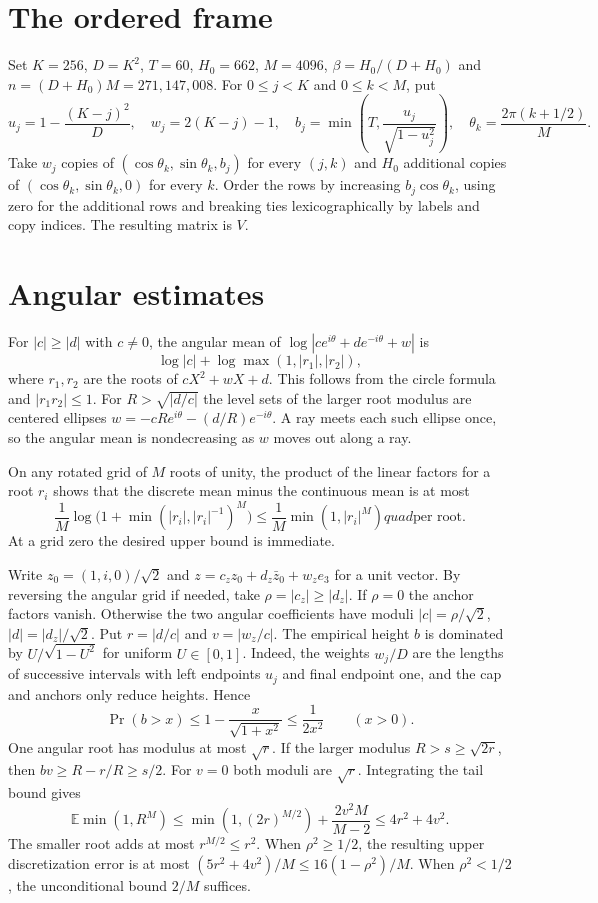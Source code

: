\documentclass[11pt]{article}
\begin{document}
\section{The ordered frame}

Set $K=256$, $D=K^2$, $T=60$, $H_0=662$, $M=4096$, $\beta=H_0/(D+H_0)$ and $n=(D+H_0)M=271{,}147{,}008$. For $0\le j<K$ and $0\le k<M$, put
\[
 u_j=1-\frac{(K-j)^2}{D},\quad
 w_j=2(K-j)-1,\quad b_j=\min\left(T,\frac{u_j}{\sqrt{1-u_j^2}}\right),\quad
 \theta_k=\frac{2\pi(k+1/2)}{M}.
\]
Take $w_j$ copies of $(\cos\theta_k,\sin\theta_k,b_j)$ for every $(j,k)$ and $H_0$ additional copies of $(\cos\theta_k,\sin\theta_k,0)$ for every $k$. Order the rows by increasing $b_j\cos\theta_k$, using zero for the additional rows and breaking ties lexicographically by labels and copy indices. The resulting matrix is $V$.

\section{Angular estimates}

For $|c|\ge |d|$ with $c\ne0$, the angular mean of
$\log|c e^{i\theta}+d e^{-i\theta}+w|$ is
\[
 \log|c|+\log\max(1,|r_1|,|r_2|),
\]
where $r_1,r_2$ are the roots of $cX^2+wX+d$. This follows from the circle formula and $|r_1r_2|\le1$. For $R>\sqrt{|d/c|}$ the level sets of the larger root modulus are centered ellipses $w=-cRe^{i\theta}-(d/R)e^{-i\theta}$. A ray meets each such ellipse once, so the angular mean is nondecreasing as $w$ moves out along a ray.

On any rotated grid of $M$ roots of unity, the product of the linear factors for a root $r_i$ shows that the discrete mean minus the continuous mean is at most
\[
 \frac1M\log\bigl(1+\min(|r_i|,|r_i|^{-1})^M\bigr)\le\frac1M\min(1,|r_i|^M)
quad\text{per root}.
\]
At a grid zero the desired upper bound is immediate.

Write $z_0=(1,i,0)/\sqrt2$ and $z=c_z z_0+d_z\bar z_0+w_z e_3$ for a unit vector. By reversing the angular grid if needed, take $\rho=|c_z|\ge|d_z|$. If $\rho=0$ the anchor factors vanish. Otherwise the two angular coefficients have moduli $|c|=\rho/\sqrt2$, $|d|=|d_z|/\sqrt2$. Put $r=|d/c|$ and $v=|w_z/c|$. The empirical height $b$ is dominated by $U/\sqrt{1-U^2}$ for uniform $U\in[0,1]$. Indeed, the weights $w_j/D$ are the lengths of successive intervals with left endpoints $u_j$ and final endpoint one, and the cap and anchors only reduce heights. Hence
\[
 \Pr(b>x)\le1-\frac{x}{\sqrt{1+x^2}}\le\frac1{2x^2}\qquad(x>0).
\]
One angular root has modulus at most $\sqrt r$. If the larger modulus $R>s\ge\sqrt{2r}$, then $bv\ge R-r/R\ge s/2$. For $v=0$ both moduli are $\sqrt r$. Integrating the tail bound gives
\[
 \mathbb E\min(1,R^M) \le \min(1,(2r)^{M/2})+\frac{2v^2M}{M-2}\le4r^2+4v^2.
\]
The smaller root adds at most $r^{M/2}\le r^2$. When $\rho^2\ge1/2$, the resulting upper discretization error is at most $(5r^2+4v^2)/M\le16(1-\rho^2)/M$. When $\rho^2<1/2$, the unconditional bound $2/M$ suffices.
\end{document}

